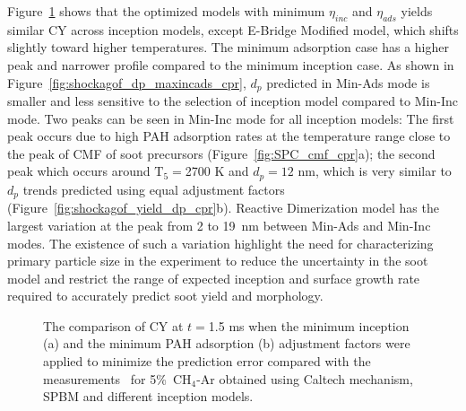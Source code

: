 Figure~\ref{fig:shockagof_yield_maxincads_cpr} shows that the optimized models with minimum $\eta_{inc}$ and $\eta_{ads}$ yields similar CY across inception models, except E-Bridge Modified model, which shifts slightly toward higher temperatures. The minimum adsorption case has a higher peak and narrower profile compared to the minimum inception case. As shown in Figure~\ref{fig:shockagof_dp_maxincads_cpr}, $d_p$ predicted in Min-Ads mode is smaller and less sensitive to the selection of inception model compared to Min-Inc mode. Two peaks can be seen in Min-Inc mode for all inception models: The first peak occurs due to high PAH adsorption rates at the temperature range close to the peak of CMF of soot precursors (Figure~\ref{fig:SPC_cmf_cpr}a); the second peak which occurs around $\mathrm{T_5}=$2700 K and $d_p=12$ nm, which is very similar to $d_p$ trends predicted using equal adjustment factors (Figure~\ref{fig:shockagof_yield_dp_cpr}b). Reactive Dimerization model has the largest variation at the peak from 2 to 19~nm between Min-Ads and Min-Inc modes. The existence of such a variation highlight the need for characterizing primary particle size in the experiment to reduce the uncertainty in the soot model and restrict the range of expected inception and surface growth rate required to accurately predict soot yield and morphology.

\begin{figure}[H]
	\centering
	\caption{The comparison of CY at $t=$1.5 ms when the minimum inception (a) and the minimum PAH adsorption (b) adjustment factors were applied to minimize the prediction error compared with the measurements~\citep{agafonov2016unified} for 5\%~$\mathrm{CH_4}$-Ar obtained using Caltech mechanism, SPBM and different inception models.}
	\label{fig:shockagof_yield_maxincads_cpr} 
\end{figure}

